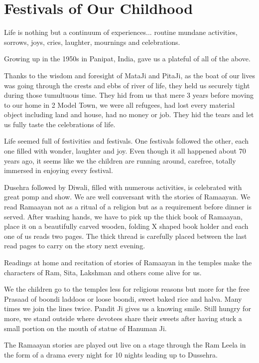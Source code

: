 \chapter{Festivals of Our Childhood}

Life is nothing but a continuum of experiences... routine mundane
activities, sorrows, joys, cries, laughter, mournings and celebrations. 

Growing up in the 1950s in Panipat, India, gave us a plateful of all of
the above. 

Thanks to the wisdom and foresight of MataJi and PitaJi, as the boat of
our lives was going through the crests and ebbs of river of life, they
held us securely tight during those tumultuous time. They hid from us that
mere 3 years before moving to our home in 2 Model Town, we were all
refugees, had lost every material object including land and house, had no
money or job. They hid the tears and let us fully taste the celebrations
of life. 

Life seemed full of festivities and festivals. One festivals followed the
other, each one filled with wonder, laughter and joy. Even though it all
happened about 70 years ago, it seems like we the children are running
around, carefree, totally immersed in enjoying every festival. 

Dusehra followed by Diwali, filled with numerous activities, is celebrated
with great pomp and show. We are well conversant with the stories of
Ramaayan. We read Ramaayan not as a ritual of a religion but as
a requirement before dinner is served. After washing hands, we have to
pick up the thick book of Ramaayan, place it on a beautifully carved
wooden, folding X shaped book holder and each one of us reads two pages.
The thick thread is carefully placed between the last read pages to carry
on the story next evening.  

Readings at home and recitation of stories of Ramaayan in the temples make
the characters of Ram, Sita, Lakshman and others come alive for us. 

We the children go to the temples less for religious reasons but more for
the free Prasaad of boondi laddoos or loose boondi, sweet baked rice and
halva. Many times we join the lines twice.  Pandit Ji gives us a knowing
smile. Still hungry for more, we stand outside where devotees share their
sweets after having stuck a small portion on the mouth of statue of
Hanuman Ji. 

The Ramaayan stories are played out live on a stage through the Ram Leela
in the form of a drama every night for 10 nights leading up to Dussehra. 

